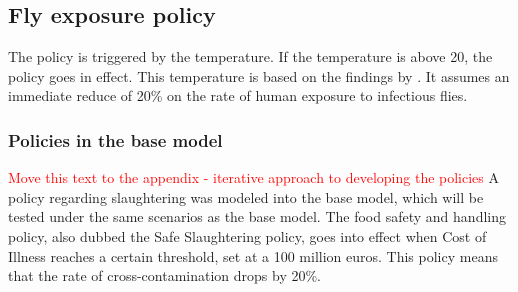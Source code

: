 \subsection{Fly exposure policy}
The policy is triggered by the temperature. If the temperature is above 20, the policy goes in effect. This temperature is based on the findings by \cite{schou_temperature_2013}. It assumes an immediate reduce of 20\% on the rate of human exposure to infectious flies.

\subsubsection{Policies in the base model}
\textcolor{red}{Move this text to the appendix - iterative approach to developing the policies}
A policy regarding slaughtering was modeled into the base model, which will be tested under the same scenarios as the base model. The food safety and handling policy, also dubbed the Safe Slaughtering policy, goes into effect when Cost of Illness reaches a certain threshold, set at a 100 million euros. This policy means that the rate of cross-contamination drops by 20\%.  

